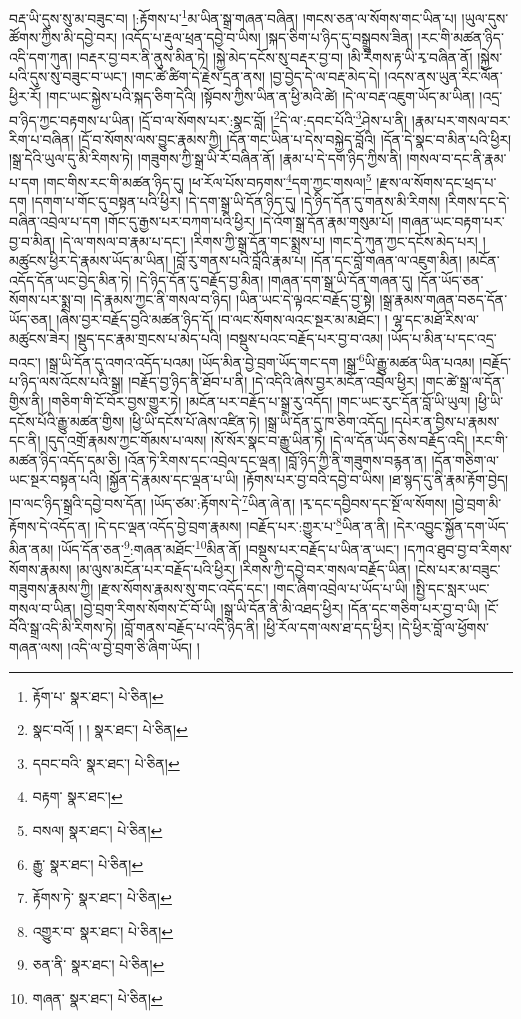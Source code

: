 བརྡ་ཡི་དུས་སུ་མ་བཟུང་བ། །:རྟོགས་པ་\footnote{རྟོག་པ་  སྣར་ཐང་།  པེ་ཅིན། }མ་ཡིན་སྒྲ་གཞན་བཞིན། །གངས་ཅན་ལ་སོགས་གང་ཡིན་པ། །ཡུལ་དུས་ཚོགས་ཀྱིས་མི་དབྱེ་བར། །འདོད་པ་རྡུལ་ཕྲན་དབྱེ་བ་ཡིས། །སྐད་ཅིག་པ་ཉིད་དུ་བསྒྲུབས་ཟིན། །རང་གི་མཚན་ཉིད་འདི་དག་ཀུན། །བརྡར་བྱ་བར་ནི་ནུས་མིན་ཏེ། །སྐྱེ་མེད་དངོས་སུ་བརྡར་བྱ་བ། །མི་རིགས་རྟ་ཡི་རྭ་བཞིན་ནོ། །སྐྱེས་པའི་དུས་སུ་བཟུང་བ་ཡང་། །གང་ཚེ་ཚིག་དེ་རྗེས་དྲན་ནས། །བྱ་བྱེད་དེ་ལ་བརྡ་མེད་དེ། །འདས་ནས་ཡུན་རིང་ལོན་ཕྱིར་རོ། །གང་ཡང་སྐྱེས་པའི་སྐད་ཅིག་དེའི། །སྟོབས་ཀྱིས་ཡིན་ན་ཕྱི་མའི་ཚེ། །དེ་ལ་བརྡ་འཇུག་ཡོད་མ་ཡིན། །འདྲ་བ་ཉིད་ཀྱང་བརྟགས་པ་ཡིན། །དྲོ་བ་ལ་སོགས་པར་:སྣང་བློ། །\footnote{སྣང་བའོ། ། །  སྣར་ཐང་།  པེ་ཅིན། }དེ་ལ་:དབང་པོའི་\footnote{དབང་བའི་  སྣར་ཐང་།  པེ་ཅིན། }ཤེས་པ་ནི། །རྣམ་པར་གསལ་བར་རིག་པ་བཞིན། །དྲོ་བ་སོགས་ལས་བྱུང་རྣམས་ཀྱི། །དོན་གང་ཡིན་པ་དེས་བསྐྱེད་བློའི། །དོན་དེ་སྣང་བ་མིན་པའི་ཕྱིར། །སྒྲ་དེའི་ཡུལ་དུ་མི་རིགས་ཏེ། །གཟུགས་ཀྱི་སྒྲ་ཡི་རོ་བཞིན་ནོ། །རྣམ་པ་དེ་དག་ཉིད་ཀྱིས་ནི། །གསལ་བ་དང་ནི་རྣམ་པ་དག །གང་གིས་རང་གི་མཚན་ཉིད་དུ། །ཕ་རོལ་པོས་བཏགས་\footnote{བརྟག་  སྣར་ཐང་། }དག་ཀྱང་གསལ།\footnote{བསལ།  སྣར་ཐང་།  པེ་ཅིན། } །རྫས་ལ་སོགས་དང་ཕྲད་པ་དག །དགག་པ་གོང་དུ་བསྟན་པའི་ཕྱིར། །དེ་དག་སྒྲ་ཡི་དོན་ཉིད་དུ། །དེ་ཉིད་དོན་དུ་གནས་མི་རིགས། །རིགས་དང་དེ་བཞིན་འབྲེལ་པ་དག །གོང་དུ་རྒྱས་པར་བཀག་པའི་ཕྱིར། །དེ་འོག་སྒྲ་དོན་རྣམ་གསུམ་པོ། །གཞན་ཡང་བརྟག་པར་བྱ་བ་མིན། །དེ་ལ་གསལ་བ་རྣམ་པ་དང་། །རིགས་ཀྱི་སྒྲ་དོན་གང་སྨྲས་པ། །གང་དེ་ཀུན་ཀྱང་དངོས་མེད་པར། །མཚུངས་ཕྱིར་དེ་རྣམས་ཡོད་མ་ཡིན། །བློ་རུ་གནས་པའི་བློའི་རྣམ་པ། །དོན་དང་བློ་གཞན་ལ་འཇུག་མིན། །མངོན་འདོད་དོན་ཡང་བྱེད་མིན་ཏེ། །དེ་ཉིད་དོན་དུ་བརྗོད་བྱ་མིན། །གཞན་དག་སྒྲ་ཡི་དོན་གཞན་དུ། །དོན་ཡོད་ཅན་སོགས་པར་སྨྲ་བ། །དེ་རྣམས་ཀྱང་ནི་གསལ་བ་ཉིད། །ཡིན་ཡང་དེ་ལྟའང་བརྗོད་བྱ་སྟེ། །སྒྲ་རྣམས་གཞན་བཅད་དོན་ཡོད་ཅན། །ཞེས་བྱར་བརྗོད་བྱའི་མཚན་ཉིད་དོ། །བ་ལང་སོགས་ལའང་སྔར་མ་མཐོང་། །
ལྷ་དང་མཐོ་རིས་ལ་མཚུངས་ཟེར། །སྡུད་དང་རྣམ་གྲངས་པ་མེད་པའི། །བསྡུས་པའང་བརྗོད་པར་བྱ་བ་འམ། །ཡོད་པ་མིན་པ་དང་འདྲ་བའང་། །སྒྲ་ཡི་དོན་དུ་འགའ་འདོད་པའམ། །ཡོད་མིན་བྱེ་བྲག་ཡོད་གང་དག །སྒྲ་\footnote{རྒྱུ་  སྣར་ཐང་།  པེ་ཅིན། }ཡི་རྒྱུ་མཚན་ཡིན་པའམ། །བརྗོད་པ་ཉིད་ལས་འོངས་པའི་སྒྲ། །བརྗོད་བྱ་ཉིད་ནི་ཐོབ་པ་ནི། །དེ་འདིའི་ཞེས་བྱར་མངོན་འབྲེལ་ཕྱིར། །གང་ཚེ་སྒྲ་ལ་དོན་གྱིས་ནི། །གཅིག་གི་ངོ་བོར་བྱས་གྱུར་ཏེ། །མངོན་པར་བརྗོད་པ་སྒྲ་རུ་འདོད། །གང་ཡང་རུང་དོན་བློ་ཡི་ཡུལ། །ཕྱི་ཡི་དངོས་པོའི་རྒྱུ་མཚན་གྱིས། །ཕྱི་ཡི་དངོས་པོ་ཞེས་འཛིན་ཏེ། །སྒྲ་ཡི་དོན་དུ་ཁ་ཅིག་འདོད། །དཔེར་ན་བྱིས་པ་རྣམས་དང་ནི། །དུད་འགྲོ་རྣམས་ཀྱང་གོམས་པ་ལས། །སོ་སོར་སྣང་བ་རྒྱུ་ཡིན་ཏེ། །དེ་ལ་དོན་ཡོད་ཅེས་བརྗོད་འདི། །རང་གི་མཚན་ཉིད་འདོད་དམ་ཅི། །འོན་ཏེ་རིགས་དང་འབྲེལ་དང་ལྡན། །བློ་ཉིད་ཀྱི་ནི་གཟུགས་བརྙན་ན། །དོན་གཅིག་ལ་ཡང་སྔར་བསྟན་པའི། །སྐྱོན་དེ་རྣམས་དང་ལྡན་པ་ཡི། །རྟོགས་པར་བྱ་བའི་དབྱེ་བ་ཡིས། །ཐ་སྙད་དུ་ནི་རྣམ་རྟོག་བྱེད། །བ་ལང་ཉིད་སྒྲའི་དབྱེ་བས་དོན། །ཡོད་ཙམ་:རྟོགས་དེ་\footnote{རྟོགས་ཏེ་  སྣར་ཐང་།  པེ་ཅིན། }ཡིན་ཞེ་ན། །རྭ་དང་དབྱིབས་དང་སྔོ་ལ་སོགས། །བྱེ་བྲག་མི་རྟོགས་དེ་འདོད་ན། །དེ་དང་ལྡན་འདོད་བྱེ་བྲག་རྣམས། །བརྗོད་པར་:གྱུར་པ་\footnote{འགྱུར་བ་  སྣར་ཐང་།  པེ་ཅིན། }ཡིན་ན་ནི། །དེར་འབྱུང་སྐྱོན་དག་ཡོད་མིན་ནམ། །ཡོད་དོན་ཅན་\footnote{ཅན་ནི་  སྣར་ཐང་།  པེ་ཅིན། }:གཞན་མཐོང་\footnote{གཞན་  སྣར་ཐང་།  པེ་ཅིན། }མིན་ནོ། །བསྡུས་པར་བརྗོད་པ་ཡིན་ན་ཡང་། །དཀའ་ཐུབ་བྱ་བ་རིགས་སོགས་རྣམས། །མ་ལུས་མངོན་པར་བརྗོད་པའི་ཕྱིར། །རིགས་ཀྱི་དབྱེ་བར་གསལ་བརྗོད་ཡིན། །ངེས་པར་མ་བཟུང་གཟུགས་རྣམས་ཀྱི། །རྫས་སོགས་རྣམས་སུ་གང་འདོད་དང་། །གང་ཞིག་འབྲེལ་པ་ཡོད་པ་ཡི། །སྤྱི་དང་སླར་ཡང་གསལ་བ་ཡིན། །བྱེ་བྲག་རིགས་སོགས་ངོ་བོ་ཡི། །སྒྲ་ཡི་དོན་ནི་མི་འཐད་ཕྱིར། །དོན་དང་གཅིག་པར་བྱ་བ་ཡི། །ངོ་བོའི་སྒྲ་འདི་མི་རིགས་ཏེ། །བློ་གནས་བརྗོད་པ་འདི་ཉིད་ནི། །ཕྱི་རོལ་དག་ལས་ཐ་དད་ཕྱིར། །དེ་ཕྱིར་བློ་ལ་ཕྱོགས་གཞན་ལས། །འདི་ལ་བྱེ་བྲག་ཅི་ཞིག་ཡོད། །
